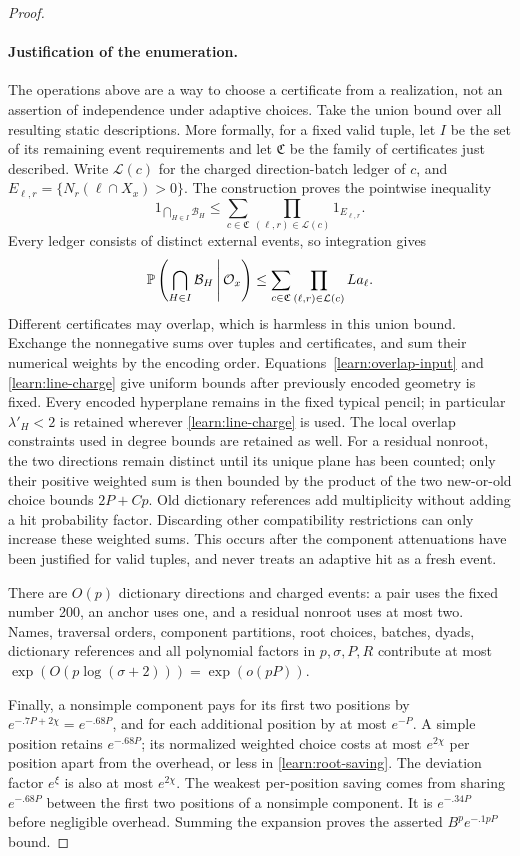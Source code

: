 \begin{proof}
\paragraph{Justification of the enumeration.}
The operations above are a way to choose a certificate from a realization,
not an assertion of independence under adaptive choices. Take the union
bound over all resulting static descriptions. More formally, for a fixed
valid tuple, let $I$ be the set of its remaining event requirements and
let $\mathfrak C$ be the family of certificates just described. Write
$\mathcal L(c)$ for the charged direction-batch ledger of $c$, and
$E_{\ell,r}=\{N_r(\ell\cap X_x)>0\}$. The construction proves the
pointwise inequality
\[
 1_{\bigcap_{H\in I}\mathcal B_H}
 \le \sum_{c\in\mathfrak C}
       \prod_{(\ell,r)\in\mathcal L(c)}1_{E_{\ell,r}}.
\]
Every ledger consists of distinct external events, so integration gives
\[
 \mathbb P\left(\bigcap_{H\in I}\mathcal B_H\,\middle|\,\mathcal O_x\right)
 \le\sum_{c\in\mathfrak C}
       \prod_{(\ell,r)\in\mathcal L(c)}La_\ell.
\]
Different certificates may overlap, which is harmless in this union
bound. Exchange the nonnegative sums over tuples and certificates, and
sum their numerical weights by the encoding order.
Equations~\eqref{learn:overlap-input} and \eqref{learn:line-charge}
give uniform bounds after previously encoded geometry is fixed.
Every encoded hyperplane remains in the fixed typical pencil; in
particular $\lambda'_H<2$ is retained wherever
\eqref{learn:line-charge} is used. The local overlap constraints used
in degree bounds are retained as well. For a residual nonroot, the two
directions remain distinct until its unique plane has been counted;
only their positive weighted sum is then bounded by the product of the
two new-or-old choice bounds $2P+Cp$. Old dictionary references add
multiplicity without adding a hit probability factor.
Discarding other compatibility restrictions can only increase
these weighted sums. This occurs after the component attenuations have been justified
for valid tuples, and never treats an adaptive hit as a fresh event.

There are $O(p)$ dictionary directions and charged events: a pair uses
the fixed number 200, an anchor uses one, and a residual nonroot uses
at most two. Names, traversal orders, component partitions, root choices,
batches, dyads, dictionary references and all polynomial factors in
$p,\sigma,P,R$ contribute at most
$\exp(O(p\log(\sigma+2)))=\exp(o(pP))$.

Finally, a nonsimple component pays for its first two positions by
$e^{-.7P+2\chi}=e^{-.68P}$, and for each additional position by at
most $e^{-P}$. A simple position retains $e^{-.68P}$; its normalized
weighted choice costs at most $e^{2\chi}$ per position apart from the
overhead, or less in \eqref{learn:root-saving}. The deviation factor
$e^\xi$ is also at most $e^{2\chi}$. The weakest per-position saving
comes from sharing $e^{-.68P}$ between the first two positions of a
nonsimple component. It is $e^{-.34P}$ before negligible overhead. Summing
the expansion proves the asserted $B^p e^{-.1pP}$ bound.
\end{proof}

